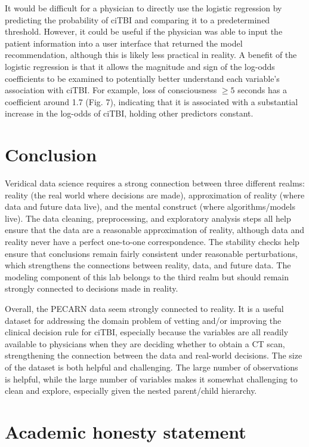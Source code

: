\documentclass[11pt,letterpaper]{article}
\begin{document}
It would be difficult for a physician to directly use the logistic regression 
by predicting the probability of ciTBI and comparing it to a predetermined 
threshold. However, it could be useful if the physician was able to input the 
patient information into a user interface that returned the model recommendation,
although this is likely less practical in reality. A benefit of the logistic regression 
is that it allows the magnitude and sign of the log-odds coefficients to be 
examined to potentially better understand each variable's association with ciTBI.
For example, loss of consciousness $\geq 5$ seconds has a coefficient around 1.7 (Fig. 7),
indicating that it is associated with a substantial increase in the log-odds of ciTBI, 
holding other predictors constant. 

\section{Conclusion}\label{conclusion}

Veridical data science requires a strong connection between three different realms: reality (the real world where decisions are made),
approximation of reality (where data and future data live), and the mental construct (where algorithms/models live).
The data cleaning, preprocessing, and exploratory analysis steps all help ensure that the data are
a reasonable approximation of reality, although data and reality never have a perfect one-to-one correspondence. 
The stability checks help ensure that conclusions remain fairly consistent under reasonable perturbations, 
which strengthens the connections between reality, data, and future data. The modeling component of 
this lab belongs to the third realm but should remain strongly connected to decisions made in reality. 

Overall, the PECARN data seem strongly connected to reality. It is a useful dataset for addressing the domain
problem of vetting and/or improving the clinical decision rule for ciTBI, especially because 
the variables are all readily available to physicians when they are deciding whether to obtain a CT scan,
strengthening the connection between the data and real-world decisions. The size of the dataset is both 
helpful and challenging. The large number of observations is helpful, while the 
large number of variables makes it somewhat challenging to clean and explore, especially given the 
nested parent/child hierarchy.  

\section{Academic honesty statement}\label{academic-honesty-statement}
\end{document}
